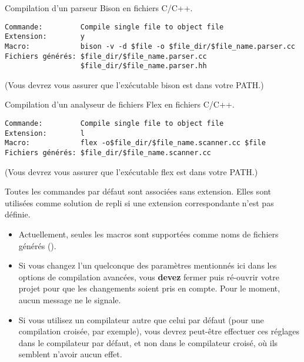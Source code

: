 
Compilation d'un parseur Bison en fichiers C/C++.
\begin{verbatim}
Commande:         Compile single file to object file
Extension:        y
Macro:            bison -v -d $file -o $file_dir/$file_name.parser.cc
Fichiers générés: $file_dir/$file_name.parser.cc
                  $file_dir/$file_name.parser.hh
\end{verbatim}
(Vous devrez vous assurer que l'exécutable bison est dans votre PATH.)\newline


Compilation d'un analyseur de fichiers Flex en fichiers C/C++.
\begin{verbatim}
Commande:         Compile single file to object file
Extension:        l
Macro:            flex -o$file_dir/$file_name.scanner.cc $file
Fichiers générés: $file_dir/$file_name.scanner.cc
\end{verbatim}
(Vous devrez vous assurer que l'exécutable flex est dans votre PATH.)

    Toutes les commandes par défaut sont associées sans extension. Elles sont utilisées comme solution de repli si une extension correspondante n'est pas définie.

\begin{itemize}
\item Actuellement, seules les macros  sont supportées comme noms de fichiers générés ().
\item Si vous changez l'un quelconque des paramètres mentionnés ici dans les options de compilation avancées, vous \textbf{devez} fermer puis ré-ouvrir votre projet pour que les changements soient pris en compte. Pour le moment, aucun message ne le signale.
\item Si vous utilisez un compilateur autre que celui par défaut (pour une compilation croisée, par exemple), vous devrez peut-être effectuer ces réglages dans le compilateur par défaut, et non dans le compilateur croisé, où ils semblent n'avoir aucun effet.
\end{itemize}